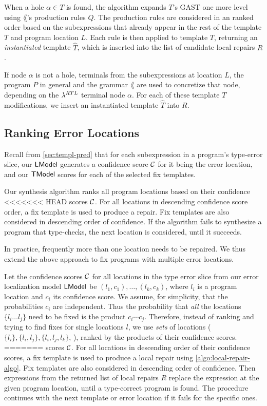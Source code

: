 When a hole $\alpha \in T$ is found, the algorithm expands $T$'s GAST one more
level using $\lang$'s production rules $Q$. The production rules are considered
in an ranked order based on the subexpressions that already appear in the rest
of the template $T$ and program location $L$. Each rule is then applied to
template $T$, returning an \emph{instantiated} template $\hat{T}$, which is
inserted into the list of candidate local repairs $R$.

If node $\alpha$ is not a hole, terminals from the subexpressions at location
$L$, the program $P$ in general and the grammar $\lang$ are used to concretize
that node, depending on the $\lambda^{RTL}$ terminal node $\alpha$. For each of
these template $T$ modifications, we insert an instantiated template $\hat{T}$
into $R$.


\subsection{Ranking Error Locations}
\label{sec:synthesis:location-rank}

Recall from \autoref{sec:templ-pred} that for each subexpression in a program's
type-error slice, our $\mathsf{LModel}$ generates a confidence score $\mathcal{C}$ for it being
the error location, and our $\mathsf{TModel}$ scores for each of the selected fix
templates.

Our synthesis algorithm ranks all program locations based on their confidence
<<<<<<< HEAD
scores $\mathcal{C}$. For all locations in descending confidence
score order, a fix template is used to produce a repair. Fix templates are also
considered in descending order of confidence. If the algorithm fails to
synthesize a program that type-checks, the next location is considered, until it
succeeds.

In practice, frequently more than one location needs to be repaired. We thus
extend the above approach to fix programs with multiple error locations.

Let the confidence scores $\mathcal{C}$ for all locations in the type error slice from
our error localization model $\mathsf{LModel}$ be $(l_1, c_1), \dots, (l_k, c_k)$, where
$l_i$ is a program location and $c_i$ its confidence score. We assume, for
simplicity, that the probabilities $c_i$ are independent. Thus
the probability that \emph{all} the locations $\{l_i \dots l_j\}$ need to be fixed
is the product $c_i \cdots c_j$. Therefore, instead of
ranking and trying to find fixes for single locations $l$,
we use \emph{sets} of locations ($\{l_i\}, \{l_i, l_j\}, \{l_i, l_j, l_k\}$, \etc),
ranked by the products of their confidence scores.
=======
scores $\mathcal{C}$. For all locations in descending order of their confidence
scores, a fix template is used to produce a local repair using
\autoref{algo:local-repair-algo}. Fix templates are also considered in
descending order of confidence. Then expressions from the returned list of local
repairs $R$ replace the expression at the given program location, until a
type-correct program is found. The procedure continues with the next template or
error location if it fails for the specific ones.

